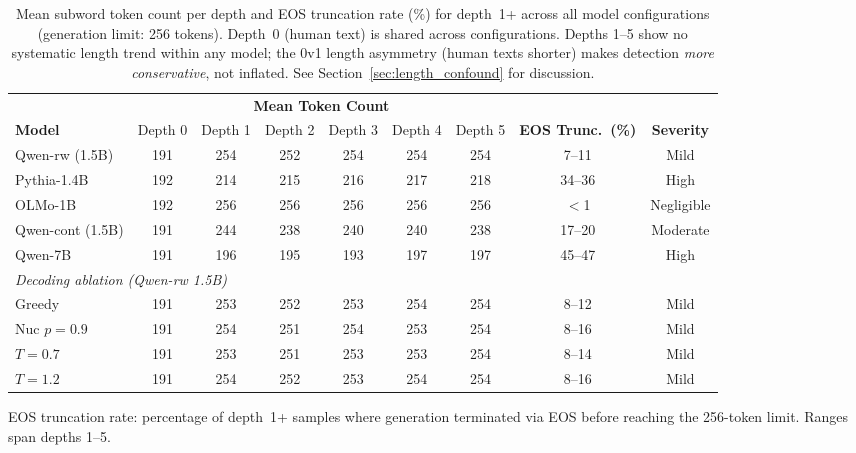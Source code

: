 \begin{table}[t]
  \centering
  \small
  \caption{Mean subword token count per depth and EOS truncation rate (\%) for depth~1+ across all model configurations (generation limit: 256 tokens). Depth~0 (human text) is shared across configurations. Depths 1--5 show no systematic length trend within any model; the 0v1 length asymmetry (human texts shorter) makes detection \emph{more conservative}, not inflated. See Section~\ref{sec:length_confound} for discussion.}
  \label{tab:token_length}
  \begin{tabular}{lcccccccc}
    \toprule
    & \multicolumn{6}{c}{\textbf{Mean Token Count}} & & \\
    \cmidrule(lr){2-7}
    \textbf{Model} & Depth 0 & Depth 1 & Depth 2 & Depth 3 & Depth 4 & Depth 5 & \textbf{EOS Trunc.\ (\%)} & \textbf{Severity} \\
    \midrule
    Qwen-rw (1.5B)  & 191 & 254 & 252 & 254 & 254 & 254 & 7--11 & Mild \\
    Pythia-1.4B      & 192 & 214 & 215 & 216 & 217 & 218 & 34--36 & High \\
    OLMo-1B          & 192 & 256 & 256 & 256 & 256 & 256 & $<$1 & Negligible \\
    Qwen-cont (1.5B) & 191 & 244 & 238 & 240 & 240 & 238 & 17--20 & Moderate \\
    Qwen-7B          & 191 & 196 & 195 & 193 & 197 & 197 & 45--47 & High \\
    \midrule
    \multicolumn{9}{l}{\textit{Decoding ablation (Qwen-rw 1.5B)}} \\
    \quad Greedy          & 191 & 253 & 252 & 253 & 254 & 254 & 8--12 & Mild \\
    \quad Nuc $p{=}0.9$   & 191 & 254 & 251 & 254 & 253 & 254 & 8--16 & Mild \\
    \quad $T{=}0.7$       & 191 & 253 & 251 & 253 & 253 & 254 & 8--14 & Mild \\
    \quad $T{=}1.2$       & 191 & 254 & 252 & 253 & 254 & 254 & 8--16 & Mild \\
    \bottomrule
  \end{tabular}

  \vspace{4pt}
  \footnotesize
  EOS truncation rate: percentage of depth~1+ samples where generation terminated via EOS before reaching the 256-token limit. Ranges span depths 1--5.
\end{table}

\clearpage
